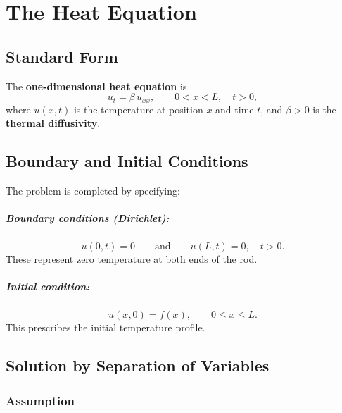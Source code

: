 \chapter{The Heat Equation}

\section{Standard Form}

\begin{definition}
The \textbf{one-dimensional heat equation} is
\[
  u_t = \beta\, u_{xx}, \qquad 0 < x < L,\quad t > 0,
\]
where $u(x,t)$ is the temperature at position $x$ and time $t$, and $\beta > 0$ is the \textbf{thermal diffusivity}.
\end{definition}

\section{Boundary and Initial Conditions}

The problem is completed by specifying:

\paragraph{Boundary conditions (Dirichlet):}
\[
  u(0,t) = 0 \qquad \text{and} \qquad u(L,t) = 0, \quad t > 0.
\]
These represent zero temperature at both ends of the rod.

\paragraph{Initial condition:}
\[
  u(x,0) = f(x), \qquad 0 \leq x \leq L.
\]
This prescribes the initial temperature profile.

\section{Solution by Separation of Variables}

\subsection{Assumption}

